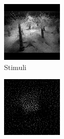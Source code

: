\begin{figure}[H]
  \setcounter{subfigure}{0}
  \begin{subfigure}[t]{0.13\textwidth}
    \centering
    \includegraphics[width=\linewidth]{img/one-trial/stimulus_4.png}
    \caption{Stimuli}
  \end{subfigure}
  \begin{subfigure}[t]{0.13\textwidth}
    \centering
    \includegraphics[width=\linewidth]{img/one-trial/intermediate-cnnv3/intermediate_3.png}

\end{subfigure}
\end{figure}
